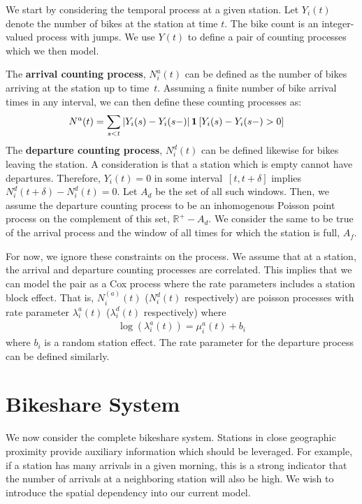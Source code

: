 \documentclass{acm_proc_article-sp}
\begin{document}
We start by considering the temporal process at a given station.  Let $Y_i (t)$ denote the number of bikes at the station at time $t$.  The bike count is an integer-valued process with jumps.  We use $Y(t)$ to define a pair of counting processes which we then model.

The {\bf arrival counting process}, $N_i^{a} (t)$ can be defined as the number of bikes arriving at the station up to time~$t$.  Assuming a finite number of bike arrival times in any interval, we can then define these counting processes as:
\begin{align}
N^{a} (t) &= \sum_{s < t} \left | Y_i (s) - Y_i (s-) \right | {\bf 1} \left[ Y_i (s) - Y_i (s-)  > 0 \right] 
\end{align}
The {\bf departure counting process}, $N_i^{d} (t)$ can be defined likewise for bikes leaving the station.  A consideration is that a station which is empty cannot have departures.  Therefore, $Y_i (t) = 0$ in some interval~$[t, t+\delta]$ implies $N_i^{d} (t+\delta) -N_i^{d} (t) = 0$.   Let $A_{d}$ be the set of all such windows.  Then, we assume the departure counting process to be an inhomogenous Poisson point process on the complement of this set, $\mathbb{R}^{+} - A_{d}$.  We consider the same to be true of the arrival process and the window of all times for which the station is full, $A_{f}$.

For now, we ignore these constraints on the process.  We assume that at a station, the arrival and departure counting processes are correlated.  This implies that we can model the pair as a Cox process where the rate parameters includes a station block effect. That is, $N_i^(a) (t)$ ($N_i^{d} (t)$ respectively) are poisson processes with rate parameter $\lambda_i^{a} (t)$ ($\lambda_i^{d} (t)$ respectively) where
\begin{align}
\log \left( \lambda_i^{a} (t) \right) = \mu^{a}_i(t) + b_i
\end{align}
\noindent where $b_i$ is a random station effect.  The rate parameter for the departure process can be defined similarly.

\section{Bikeshare System}

We now consider the complete bikeshare system.  Stations in close geographic proximity provide auxiliary information which should be leveraged.  For example, if a station has many arrivals in a given morning, this is a strong indicator that the number of arrivals at a neighboring station will also be high.  We wish to introduce the spatial dependency into our current model.  
\end{document}
